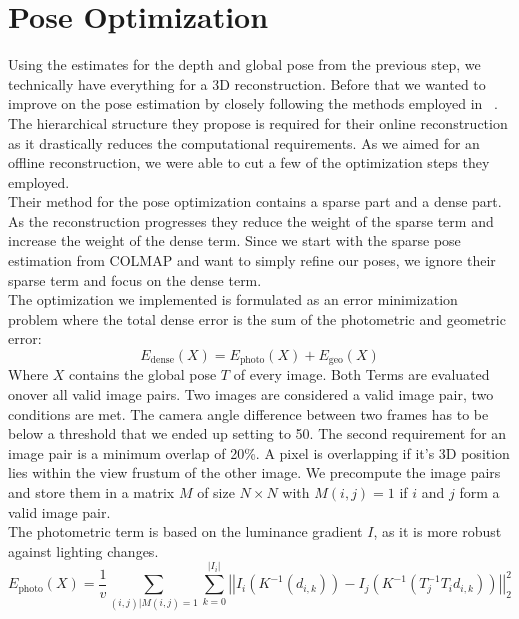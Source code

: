     \section{Pose Optimization}\label{sec:method_pose_optimization}
        Using the estimates for the depth and global pose from the previous step, we technically have everything for a 3D reconstruction.
        Before that we wanted to improve on the pose estimation by closely following the methods employed in ~\cite{dai2017bundlefusion}.
        The hierarchical structure they propose is required for their online reconstruction as it drastically reduces the computational requirements.
        As we aimed for an offline reconstruction, we were able to cut a few of the optimization steps they employed.\\
        Their method for the pose optimization contains a sparse part and a dense part.
        As the reconstruction progresses they reduce the weight of the sparse term and increase the weight of the dense term.
        Since we start with the sparse pose estimation from COLMAP and want to simply refine our poses, we ignore their sparse term and focus on the dense term.\\
        The optimization we implemented is formulated as an error minimization problem where the total dense error is the sum of the photometric and geometric error:
        \begin{equation}
            E_{\text{dense}}(X) = E_{\text{photo}}(X) + E_{\text{geo}}(X)
            \label{eq:edense}
        \end{equation}
        Where $X$ contains the global pose $T$ of every image.
        Both Terms are evaluated onover all valid image pairs.
        Two images are considered a valid image pair, two conditions are met.
        The camera angle difference between two frames has to be below a threshold that we ended up setting to 50\textdegree.
        The second requirement for an image pair is a minimum overlap of 20\%.
        A pixel is overlapping if it's 3D position lies within the view frustum of the other image.
        We precompute the image pairs and store them in a matrix $M$ of size $N \times N$ with $M(i,j) = 1$ if $i$ and $j$ form a valid image pair.\\
        The photometric term is based on the luminance gradient $I$, as it is more robust against lighting changes.
        \begin{equation}
            E_{\text{photo}}(X) =
            \frac{1}{v} \sum_{(i,j) | M(i,j)=1}\sum_{k=0}^{\left\lvert I_i \right\rvert}
            \left\lvert\left\lvert
            I_i(K^{-1}(d_{i,k})) - I_j(K^{-1}(T_j^{-1}T_id_{i,k}))
            \right\rvert\right\rvert_2^2
            \label{eq:ephoto}
        \end{equation}
